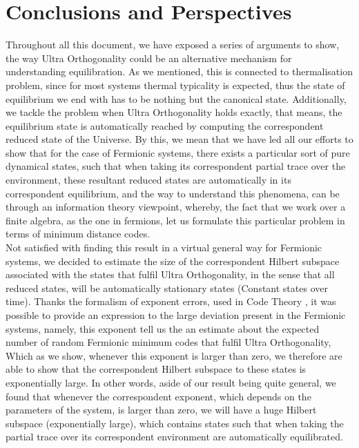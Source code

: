 \chapter{Conclusions and Perspectives}

Throughout all this document, we have exposed a series of arguments to show, the way Ultra Orthogonality could be an alternative mechanism for understanding equilibration.  As we mentioned, this is connected to thermalisation problem, since for most systems thermal typicality is expected, thus the state of equilibrium we end with has to be nothing but the canonical state. Additionally, we tackle the problem when Ultra Orthogonality holds exactly, that means, the equilibrium state is automatically reached by computing the correspondent reduced state of the Universe. By this, we mean that we have led all our efforts to show that for the case of Fermionic systems, there exists a particular sort of pure dynamical states, such that when taking its correspondent partial trace over the environment, these resultant reduced states are automatically in its correspondent equilibrium, and the way to understand this phenomena, can be through an information theory viewpoint, whereby, the fact that we work over a finite algebra, as the one in fermions, let us formulate this particular problem in terms of minimum distance codes.\\



\indent Not satisfied with finding this result in a virtual general way for Fermionic systems, we decided to estimate the size of the correspondent Hilbert subspace associated with the states that fulfil Ultra Orthogonality, in the sense that all reduced states, will be automatically stationary states (Constant states over time). Thanks the formalism of exponent errors, used in Code Theory , it was possible to provide an expression to the large deviation present in the Fermionic systems, namely, this exponent tell us the an estimate about the expected number of random Fermionic minimum codes that fulfil Ultra Orthogonality, Which as we show, whenever this exponent is larger than zero, we therefore are able to show that the correspondent Hilbert subspace to these states is exponentially large. In other words, aside of our result being quite general, we found that whenever the correspondent exponent, which depends on the parameters of the system, is larger than zero, we will have a huge Hilbert subspace (exponentially large), which contains states such that when taking the partial trace over its correspondent environment are automatically equilibrated.\\

